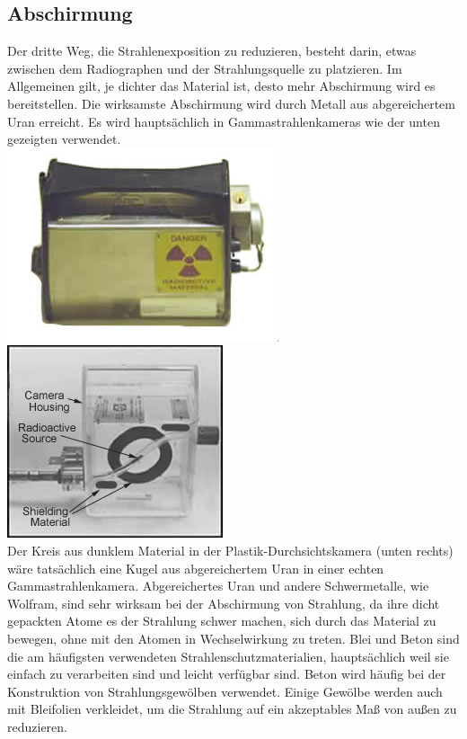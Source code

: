 \subsection{Abschirmung}
Der dritte Weg, die Strahlenexposition zu reduzieren, besteht darin, etwas zwischen dem Radiographen und der Strahlungsquelle zu platzieren. Im Allgemeinen gilt, je dichter das Material ist, desto mehr Abschirmung wird es bereitstellen. Die wirksamste Abschirmung wird durch Metall aus abgereichertem Uran erreicht. Es wird hauptsächlich in Gammastrahlenkameras wie der unten gezeigten verwendet.\\
\includegraphics[scale=0.9]{img/cameraoutside.jpg} 
 \includegraphics[scale=0.5]{img/camera_pigtail.jpg}\\
Der Kreis aus dunklem Material in der Plastik-Durchsichtskamera (unten rechts) wäre tatsächlich eine Kugel aus abgereichertem Uran in einer echten Gammastrahlenkamera. Abgereichertes Uran und andere Schwermetalle, wie Wolfram, sind sehr wirksam bei der Abschirmung von Strahlung, da ihre dicht gepackten Atome es der Strahlung schwer machen, sich durch das Material zu bewegen, ohne mit den Atomen in Wechselwirkung zu treten. Blei und Beton sind die am häufigsten verwendeten Strahlenschutzmaterialien, hauptsächlich weil sie einfach zu verarbeiten sind und leicht verfügbar sind. Beton wird häufig bei der Konstruktion von Strahlungsgewölben verwendet. Einige Gewölbe werden auch mit Bleifolien verkleidet, um die Strahlung auf ein akzeptables Maß von außen zu reduzieren.

